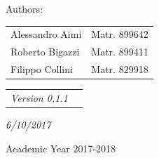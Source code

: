 \documentclass[a4paper,12pt,twoside]{report}
\begin{document}
\begin{center}
\begin{center}
\vspace{10mm}
Authors:
\vspace{-3mm}
\end{center}
\begin{center}
\begin{tabular}{l l }
Alessandro Aimi & Matr. 899642 \\
Roberto Bigazzi & Matr. 899411 \\
Filippo Collini & Matr. 829918
\end{tabular}
\end{center}
\vspace{10mm}

\begin{center}
\begin{tabular}{l l }
\it{Version 0.1.1} \\
\end{tabular}
\end{center}
\begin{center}
\vspace{-4mm}
\it{6/10/2017}
\end{center}
\vspace{-4mm}
{\large{Academic Year 2017-2018}}
\end{center}

\end{document}
